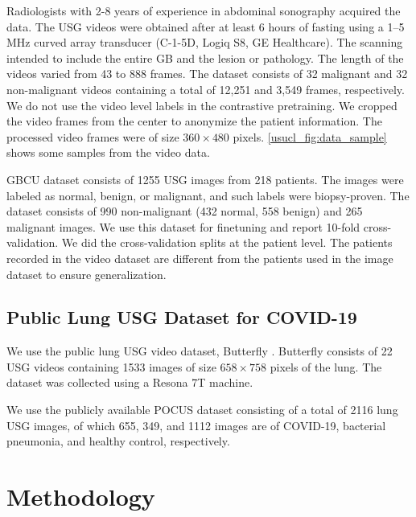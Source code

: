 %
Radiologists with 2-8 years of experience in abdominal sonography acquired the data. The USG videos were obtained after at least 6 hours of fasting using a 1--5 MHz curved array transducer (C-1-5D, Logiq S8, GE Healthcare). The scanning intended to include the entire GB and the lesion or pathology. %
The length of the videos varied from 43 to 888 frames. %
The dataset consists of 32 malignant and 32 non-malignant videos containing a total of 12,251 and 3,549 frames, respectively. We do not use the video level labels in the contrastive pretraining. We cropped the video frames from the center to anonymize the patient information. The processed video frames were of size $360\!\times\!480$ pixels. \cref{usucl_fig:data_sample} shows some samples from the video data. 

%
GBCU dataset \cite{basu2022surpassing} consists of 1255 USG images from 218 patients. The images were labeled as normal, benign, or malignant, and such labels were biopsy-proven. The dataset consists of 990 non-malignant (432 normal, 558 benign) and 265 malignant images.  We use this dataset for finetuning and report 10-fold cross-validation. We did the cross-validation splits at the patient level. 
The patients recorded in the video dataset are different from the patients used in the image dataset to ensure generalization. 

\subsection{Public Lung USG Dataset for COVID-19}

%
We use the public lung USG video dataset, Butterfly \cite{butterfly}. Butterfly consists of 22 USG videos containing 1533 images of size $658\!\times\!758$ pixels of the lung. The dataset was collected using a Resona 7T machine.

%
We use the publicly available POCUS \cite{pocus} dataset consisting of a total of 2116 lung USG images, of which 655, 349, and 1112 images are of COVID-19, bacterial pneumonia, and healthy control, respectively.

%
%
\section{Methodology}

